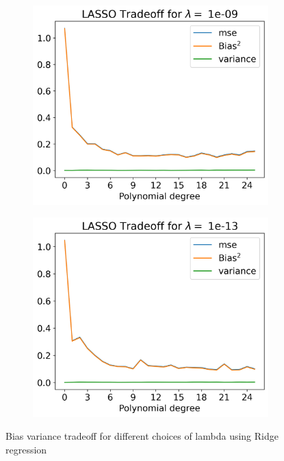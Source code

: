 \documentclass[12pt]{article}
\begin{document}
\begin{figure}[H]
  \begin{subfigure}{.5\textwidth}
    \centering
    \includegraphics[width=\textwidth]{../figures/tradeoff_LASSO_1e-09real.png}
    \caption{}
    \label{fig:}
  \end{subfigure}
  \begin{subfigure}{.5\textwidth}
    \centering
    \includegraphics[width=\textwidth]{../figures/tradeoff_LASSO_1e-13real.png}
    \caption{}
    \label{fig:}
  \end{subfigure}
  \caption{Bias variance tradeoff for different choices of lambda using Ridge regression}
  \label{fig:lasso_tradeoff_real}
\end{figure}
\end{document}
